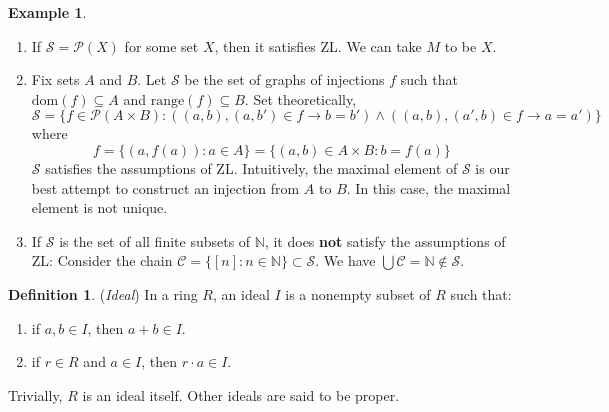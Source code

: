 \documentclass[14pt]{article}
\theoremstyle{definition}
\newtheorem*{example}{Example}
\newtheorem{definition}{Definition}[subsection]
\newcommand{\bb}[1]{\mathbb{#1}}
\begin{document}
\begin{example}\hfill
    \begin{enumerate}
        \item If $\mathcal{S}=\mathcal{P}(X)$ for some set $X$, then it satisfies ZL.
        We can take $M$ to be $X$.
        \item Fix sets $A$ and $B$. Let $\mathcal{S}$ be the set of graphs of injections $f$ 
        such that $\mathrm{dom}(f)\subseteq A$ and $\mathrm{range}(f)\subseteq B$. Set 
        theoretically,
        \begin{equation*}
            \mathcal{S}=\{f\in \mathcal{P}(A\times B)\colon ((a,b), (a,b')\in f\to b=b')
            \wedge ((a,b),(a',b)\in f\to a=a')\}
        \end{equation*}
        where 
        \begin{equation*}
            f=\{(a, f(a))\colon a\in A\}=\{(a,b)\in A\times B\colon b=f(a)\}
        \end{equation*}
        $\mathcal{ S}$ satisfies the assumptions of ZL. Intuitively, the maximal element of
        $\mathcal{S}$ is our best attempt to construct an injection from $A$ to $B$. In this 
        case, the maximal element is not unique.
        \item If  $\mathcal{S}$ is the set of all finite subsets of $\bb{N}$, it does 
        \textbf{not} satisfy the assumptions of ZL: Consider the chain $\mathcal{C}=
        \{[n]\colon n\in \bb{N}\}\subset\mathcal{S}$. We have $\bigcup \mathcal{C}
        =\bb{N}\not\in \mathcal{ S}$. 
    \end{enumerate}
    
\end{example}

\vspace{2mm}

\begin{definition}
    (\textit{Ideal}) In a ring $R$, an ideal $I$ is a nonempty subset of $R$ such that:
    \begin{enumerate}
        \item if $a,b\in I$, then $a+b\in I$.
        \item if $r\in R$ and $a\in I$, then $r\cdot a\in I$.
    \end{enumerate}
    Trivially, $R$ is an ideal itself. Other ideals are said to be proper.
\end{definition}

\vspace{2mm}
\end{document}
